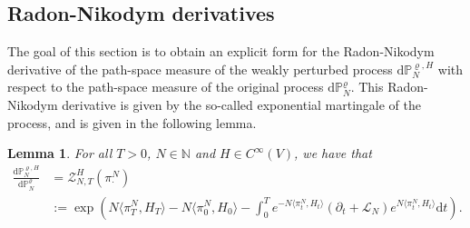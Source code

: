 \documentclass[11pt]{article}
\numberwithin{equation}{section}
\theoremstyle{definition}
\theoremstyle{plain}
\newtheorem{Lemma}[Theorem]{Lemma}
\newcommand{\p}{\mathbb{P}}
\newcommand{\dd}{\mathrm{d}}
\begin{document}
\subsection{Radon-Nikodym derivatives}
The goal of this section is to obtain an explicit form for the Radon-Nikodym derivative of the path-space measure of the weakly perturbed process $\dd\p^{\varrho,H}_N$ with respect to the path-space measure of the original process $\dd \p^{\varrho}_N$. This Radon-Nikodym derivative is given by the so-called exponential martingale of the process, and is given in the following lemma.
\begin{Lemma}
    For all $T>0$, $N\in\mathbb{N}$ and $H \in C^\infty(V)$, we have that 
        \begin{align}\label{exp mart}
            \frac{\dd\p^{\varrho,H}_N}{\dd\p^{\varrho}_N} 
            &= \mathcal{Z}^H_{N,T}(\pi^N_{\cdot})\nonumber\\
            &:= \exp\left(N\langle \pi^N_{T}, H_T\rangle  - N\langle \pi^N_{0}, H_0\rangle - \int_0^T e^{-N\langle \pi^N_{t},H_t\rangle}(\partial_t + \mathscr{L}_N) e^{N\langle \pi^N_{t},H_t\rangle} \dd t \right).
        \end{align}
\end{Lemma}
\end{document}
